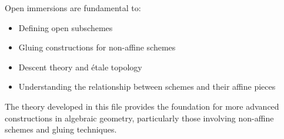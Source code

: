 \documentclass{article}
\theoremstyle{definition}
\begin{document}
Open immersions are fundamental to:
\begin{itemize}
\item Defining open subschemes
\item Gluing constructions for non-affine schemes
\item Descent theory and étale topology
\item Understanding the relationship between schemes and their affine pieces
\end{itemize}

The theory developed in this file provides the foundation for more advanced constructions in algebraic geometry, particularly those involving non-affine schemes and gluing techniques.
\end{document}
